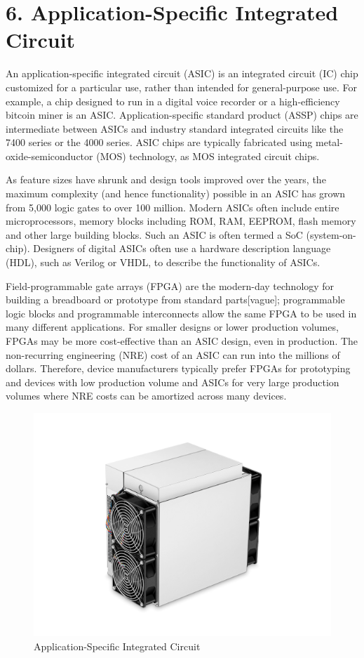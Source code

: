 \pagebreak
\section*{6. Application-Specific Integrated Circuit}

An application-specific integrated circuit (ASIC) is an integrated circuit (IC) chip customized for a particular use, rather than intended for general-purpose use. For example, a chip designed to run in a digital voice recorder or a high-efficiency bitcoin miner is an ASIC. Application-specific standard product (ASSP) chips are intermediate between ASICs and industry standard integrated circuits like the 7400 series or the 4000 series. ASIC chips are typically fabricated using metal-oxide-semiconductor (MOS) technology, as MOS integrated circuit chips.\vspace{.3cm}

As feature sizes have shrunk and design tools improved over the years, the maximum complexity (and hence functionality) possible in an ASIC has grown from 5,000 logic gates to over 100 million. Modern ASICs often include entire microprocessors, memory blocks including ROM, RAM, EEPROM, flash memory and other large building blocks. Such an ASIC is often termed a SoC (system-on-chip). Designers of digital ASICs often use a hardware description language (HDL), such as Verilog or VHDL, to describe the functionality of ASICs.\vspace{.3cm}

Field-programmable gate arrays (FPGA) are the modern-day technology for building a breadboard or prototype from standard parts[vague]; programmable logic blocks and programmable interconnects allow the same FPGA to be used in many different applications. For smaller designs or lower production volumes, FPGAs may be more cost-effective than an ASIC design, even in production. The non-recurring engineering (NRE) cost of an ASIC can run into the millions of dollars. Therefore, device manufacturers typically prefer FPGAs for prototyping and devices with low production volume and ASICs for very large production volumes where NRE costs can be amortized across many devices.\vspace{.3cm}

\begin{figure}[h]
	\centering
	\includegraphics[width=0.7\linewidth]{images/176bd485-ad85-44f7-b60b-cdcbd32de623_540}
	\captionsetup{labelformat=empty}
	\caption{Application-Specific Integrated Circuit}
\end{figure}

